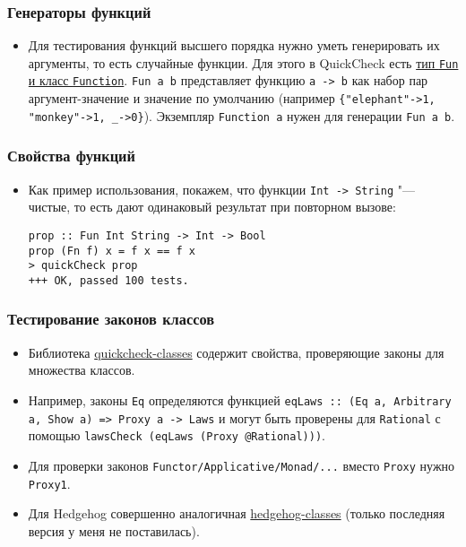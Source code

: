 \documentclass[11pt]{beamer}
\begin{document}
\begin{frame}[fragile]
  \frametitle{Генераторы функций}
  \begin{itemize}
    \item Для тестирования функций высшего порядка нужно уметь генерировать их аргументы, то есть случайные функции. Для этого в QuickCheck есть \href{http://hackage.haskell.org/package/QuickCheck-2.13.1/docs/Test-QuickCheck.html#g:14}{тип \lstinline|Fun| и класс \lstinline|Function|}. \lstinline|Fun a b| представляет функцию \lstinline|a -> b| как набор пар аргумент-значение и значение по умолчанию (например \lstinline|{"elephant"->1, "monkey"->1, _->0}|). Экземпляр \lstinline|Function a| нужен для генерации \lstinline|Fun a b|.
  \end{itemize}
\end{frame}

\begin{frame}[fragile]
  \frametitle{Свойства функций}
  \begin{itemize}
    \item Как пример использования, покажем, что функции \lstinline|Int -> String| "--- чистые, то есть дают одинаковый результат при повторном вызове:
          \begin{lstlisting}
prop :: Fun Int String -> Int -> Bool
prop (Fn f) x = f x == f x
> quickCheck prop
+++ OK, passed 100 tests.
\end{lstlisting}
  \end{itemize}
\end{frame}

\begin{frame}[fragile]
  \frametitle{Тестирование законов классов}
  \begin{itemize}
    \item Библиотека \href{http://hackage.haskell.org/package/quickcheck-classes}{quickcheck-classes} содержит свойства, проверяющие законы для множества классов.
    \item Например, законы \lstinline|Eq| определяются функцией \lstinline|eqLaws :: (Eq a, Arbitrary a, Show a) => Proxy a -> Laws| и могут быть проверены для \lstinline|Rational| с помощью \lstinline|lawsCheck (eqLaws (Proxy @Rational)))|.
    \item Для проверки законов \lstinline|Functor/Applicative/Monad/...| вместо \lstinline|Proxy| нужно \lstinline|Proxy1|.
    \item Для Hedgehog совершенно аналогичная \href{https://hackage.haskell.org/package/hedgehog-classes}{hedgehog-classes} (только последняя версия у меня не поставилась).
  \end{itemize}
\end{frame}
\end{document}
